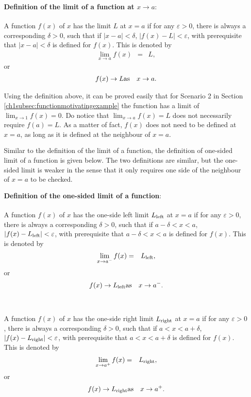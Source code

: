 \begin{VF}
\textbf{Definition of the limit of a function at $x\rightarrow a$}:
\\
\\
\noindent A function $f(x)$ of $x$ has the limit $L$ at $x=a$ if for any $\varepsilon > 0$, there is always a corresponding $\delta > 0$, such that if $|x-a|<\delta$, $|f(x)-L| < \varepsilon$, with prerequisite that $|x-a|<\delta$ is defined for $f(x)$. This is denoted by
\begin{eqnarray}
   \lim_{x\rightarrow a} f(x) &=& L, \nonumber
\end{eqnarray}
or
\begin{eqnarray}
  f(x) \rightarrow L & \textup{as} & x \rightarrow a. \nonumber
\end{eqnarray}
\end{VF}

Using the definition above, it can be proved easily that for Scenario 2 in Section \ref{ch1subsec:functionmotivatingexample} the function has a limit of $\lim_{x\rightarrow 1}f(x)=0$. Do notice that $\lim_{x\rightarrow a}f(x)=L$ does not necessarily require $f(a)=L$. As a matter of fact, $f(x)$ does not need to be defined at $x=a$, as long as it is defined at the neighbour of $x=a$.

Similar to the definition of the limit of a function, the definition of one-sided limit of a function is given below. The two definitions are similar, but the one-sided limit is weaker in the sense that it only requires one side of the neighbour of $x=a$ to be checked.

\begin{VF}
\textbf{Definition of the one-sided limit of a function}:
\\
\\
\noindent A function $f(x)$ of $x$ has the one-side left limit $L_\textup{left}$ at $x=a$ if for any $\varepsilon > 0$, there is always a corresponding $\delta > 0$, such that if $a-\delta<x<a$, $|f(x)-L_\textup{left}| < \varepsilon$, with prerequisite that $a-\delta<x<a$ is defined for $f(x)$. This is denoted by
\begin{eqnarray}
   \lim_{x\rightarrow a^-} f(x) &=& L_\textup{left}, \nonumber
\end{eqnarray}
or
\begin{eqnarray}
  f(x) \rightarrow L_\textup{left} & \textup{as} & x \rightarrow a^-. \nonumber
\end{eqnarray}
\\
\\
\noindent A function $f(x)$ of $x$ has the one-side right limit $L_\textup{right}$ at $x=a$ if for any $\varepsilon > 0$, there is always a corresponding $\delta > 0$, such that if $a<x<a+\delta$, $|f(x)-L_\textup{right}| < \varepsilon$, with prerequisite that $a<x<a+\delta$ is defined for $f(x)$. This is denoted by
\begin{eqnarray}
   \lim_{x\rightarrow a^+} f(x) &=& L_\textup{right}, \nonumber
\end{eqnarray}
or
\begin{eqnarray}
  f(x) \rightarrow L_\textup{right} & \textup{as} & x \rightarrow a^+. \nonumber
\end{eqnarray}
\end{VF}

